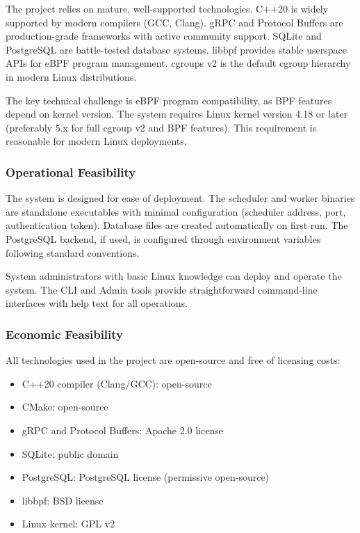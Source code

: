 The project relies on mature, well-supported technologies. C++20 is widely supported by modern compilers (GCC, Clang). gRPC and Protocol Buffers are production-grade frameworks with active community support. SQLite and PostgreSQL are battle-tested database systems. libbpf provides stable userspace APIs for eBPF program management. cgroups v2 is the default cgroup hierarchy in modern Linux distributions.

The key technical challenge is eBPF program compatibility, as BPF features depend on kernel version. The system requires Linux kernel version 4.18 or later (preferably 5.x for full cgroup v2 and BPF features). This requirement is reasonable for modern Linux deployments.

\subsubsection{Operational Feasibility}

The system is designed for ease of deployment. The scheduler and worker binaries are standalone executables with minimal configuration (scheduler address, port, authentication token). Database files are created automatically on first run. The PostgreSQL backend, if used, is configured through environment variables following standard conventions.

System administrators with basic Linux knowledge can deploy and operate the system. The CLI and Admin tools provide straightforward command-line interfaces with help text for all operations.

\subsubsection{Economic Feasibility}

All technologies used in the project are open-source and free of licensing costs:
\begin{itemize}
	\item C++20 compiler (Clang/GCC): open-source
	\item CMake: open-source
	\item gRPC and Protocol Buffers: Apache 2.0 license
	\item SQLite: public domain
	\item PostgreSQL: PostgreSQL license (permissive open-source)
	\item libbpf: BSD license
	\item Linux kernel: GPL v2
\end{itemize}

